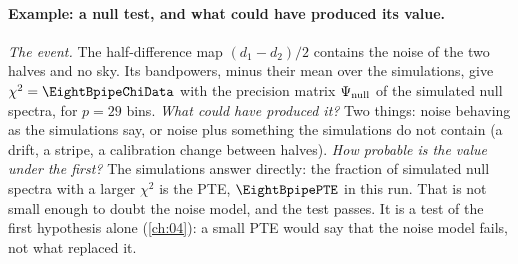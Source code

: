 \paragraph{Example: a null test, and what could have produced its value.}
\emph{The event.} The half-difference map $(d_1-d_2)/2$ contains the noise of the two halves and no sky.
Its bandpowers, minus their mean over the simulations, give $\chi^2=\EightBpipeChiData$ with the precision
matrix $\Psi_{\rm null}$ of the simulated null spectra, for $p=29$ bins.
\emph{What could have produced it?} Two things: noise behaving as the simulations say, or noise plus
something the simulations do not contain (a drift, a stripe, a calibration change between halves).
\emph{How probable is the value under the first?} The simulations answer directly: the fraction of
simulated null spectra with a larger $\chi^2$ is the PTE, $\EightBpipePTE$ in this run. That is not small
enough to doubt the noise model, and the test passes. It is a test of the first hypothesis alone (\cref{ch:04}): a
small PTE would say that the noise model fails, not what replaced it.


